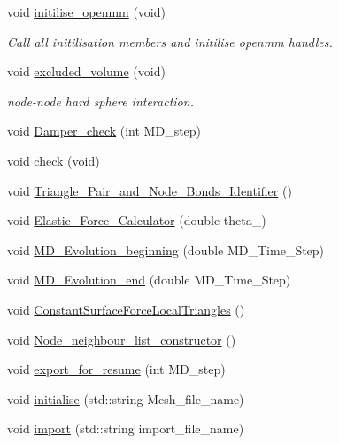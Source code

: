\begin{DoxyCompactItemize}
\item 
void \mbox{\hyperlink{classMembrane_a8ffb572d8b3b2cf07b2cb5e487fbc3b9}{initilise\+\_\+openmm}} (void)
\begin{DoxyCompactList}\small\item\em Call all initilisation members and initilise openmm handles. \end{DoxyCompactList}\item 
void \mbox{\hyperlink{classMembrane_a917057b75f5a7f766eb747daf40a1ef4}{excluded\+\_\+volume}} (void)
\begin{DoxyCompactList}\small\item\em node-\/node hard sphere interaction. \end{DoxyCompactList}\item 
void \mbox{\hyperlink{classMembrane_a86a920d04b19c6df2888c339c4f8cbc6}{Damper\+\_\+check}} (int M\+D\+\_\+step)
\item 
void \mbox{\hyperlink{classMembrane_ae67772a7835b7d550d8e832ae99842fa}{check}} (void)
\item 
void \mbox{\hyperlink{classMembrane_ad34ca5376368cc72a38b64ed6b0dd386}{Triangle\+\_\+\+Pair\+\_\+and\+\_\+\+Node\+\_\+\+Bonds\+\_\+\+Identifier}} ()
\item 
void \mbox{\hyperlink{classMembrane_aff8b24e17a5e51e8e00f1c1780694d1f}{Elastic\+\_\+\+Force\+\_\+\+Calculator}} (double theta\+\_)
\item 
void \mbox{\hyperlink{classMembrane_a718a254c0f843b06e07d0aad8451b652}{M\+D\+\_\+\+Evolution\+\_\+beginning}} (double M\+D\+\_\+\+Time\+\_\+\+Step)
\item 
void \mbox{\hyperlink{classMembrane_a5292913dd4500db14e26147920a21e58}{M\+D\+\_\+\+Evolution\+\_\+end}} (double M\+D\+\_\+\+Time\+\_\+\+Step)
\item 
void \mbox{\hyperlink{classMembrane_afeb736c81896f74f23e44ceaaa0d1e04}{Constant\+Surface\+Force\+Local\+Triangles}} ()
\item 
void \mbox{\hyperlink{classMembrane_aca9785ad0ab2514006a46c0c9bd8cf5c}{Node\+\_\+neighbour\+\_\+list\+\_\+constructor}} ()
\item 
void \mbox{\hyperlink{classMembrane_a45aaa9c0cbd3d22aa9b03e24480b69de}{export\+\_\+for\+\_\+resume}} (int M\+D\+\_\+step)
\item 
void \mbox{\hyperlink{classMembrane_ad0a4afaf92d04e327cb74cc5cad2ef7b}{initialise}} (std\+::string Mesh\+\_\+file\+\_\+name)
\item 
void \mbox{\hyperlink{classMembrane_ab235205040b763fa4c5045eddacf8034}{import}} (std\+::string import\+\_\+file\+\_\+name)

\end{DoxyCompactItemize}
